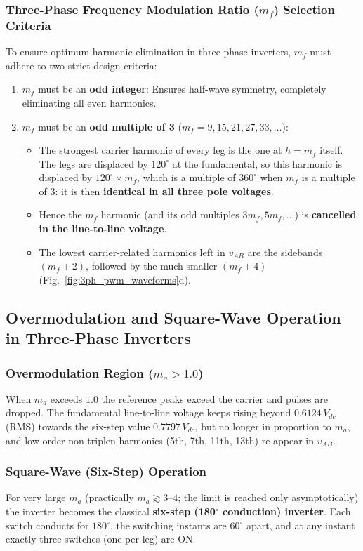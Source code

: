 \documentclass[11pt,a4paper]{article}
\let\origsubsection\subsection
\renewcommand{\subsection}{\Needspace{7\baselineskip}\origsubsection}
\begin{document}
\subsubsection{Three-Phase Frequency Modulation Ratio ($m_f$) Selection Criteria}
To ensure optimum harmonic elimination in three-phase inverters, $m_f$ must adhere to two strict design criteria:
\begin{enumerate}
  \item $m_f$ must be an \textbf{odd integer}: Ensures half-wave symmetry, completely eliminating all even harmonics.
  \item $m_f$ must be an \textbf{odd multiple of 3} ($m_f = 9, 15, 21, 27, 33, \dots$):
  \begin{itemize}
    \item The strongest carrier harmonic of every leg is the one at $h = m_f$ itself. The legs are displaced by $120^\circ$ at the fundamental, so this harmonic is displaced by $120^\circ \times m_f$, which is a multiple of $360^\circ$ when $m_f$ is a multiple of 3: it is then \textbf{identical in all three pole voltages}.
    \item Hence the $m_f$ harmonic (and its odd multiples $3m_f, 5m_f, \dots$) is \textbf{cancelled in the line-to-line voltage}.
    \item The lowest carrier-related harmonics left in $v_{AB}$ are the sidebands $(m_f \pm 2)$, followed by the much smaller $(m_f \pm 4)$ (Fig.~\ref{fig:3ph_pwm_waveforms}d).
  \end{itemize}
\end{enumerate}

\subsection{Overmodulation and Square-Wave Operation in Three-Phase Inverters}

\subsubsection{Overmodulation Region ($m_a > 1.0$)}
When $m_a$ exceeds $1.0$ the reference peaks exceed the carrier and pulses are dropped. The fundamental line-to-line voltage keeps rising beyond $0.6124\,V_{dc}$ (RMS) towards the six-step value $0.7797\,V_{dc}$, but no longer in proportion to $m_a$, and low-order non-triplen harmonics (5th, 7th, 11th, 13th) re-appear in $v_{AB}$.

\subsubsection{Square-Wave (Six-Step) Operation}
For very large $m_a$ (practically $m_a \gtrsim 3$--$4$; the limit is reached only asymptotically) the inverter becomes the classical \textbf{six-step (180$^\circ$ conduction) inverter}. Each switch conducts for $180^\circ$, the switching instants are $60^\circ$ apart, and at any instant exactly three switches (one per leg) are ON.
\end{document}
